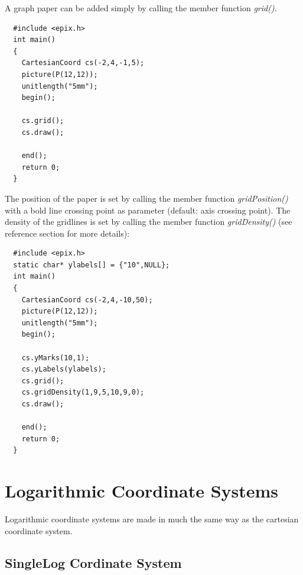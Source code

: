 \documentclass[12pt,a4paper]{article}
\begin{document}
  A graph paper can be added simply by calling the member function
  \textit{grid()}.

  \begin{minipage}{7.5cm}
    \begin{lstlisting}
  #include <epix.h>
  int main()
  {
    CartesianCoord cs(-2,4,-1,5);
    picture(P(12,12));
    unitlength("5mm");
    begin();

    cs.grid();
    cs.draw();

    end();
    return 0;
  }
    \end{lstlisting}
  \end{minipage}
  \begin{minipage}{5.5cm}
    
  \end{minipage}


  The position of the paper is set by calling the member function
  \textit{gridPosition()} with a bold line crossing point as parameter (default:
  axis crossing point). The density of the gridlines is set by calling the
  member function \textit{gridDensity()} (see reference section for more details):

  \begin{minipage}{7.5cm}
    \begin{lstlisting}
  #include <epix.h>
  static char* ylabels[] = {"10",NULL};
  int main()
  {
    CartesianCoord cs(-2,4,-10,50);
    picture(P(12,12));
    unitlength("5mm");
    begin();

    cs.yMarks(10,1);
    cs.yLabels(ylabels);
    cs.grid();
    cs.gridDensity(1,9,5,10,9,0);
    cs.draw();

    end();           
    return 0;
  }
    \end{lstlisting}
  \end{minipage}
  \begin{minipage}{5.5cm}
    \vspace{1.0cm}
    
  \end{minipage}


  \newpage
  \section{Logarithmic Coordinate Systems}

  Logarithmic coordinate systems are made in much the same way as the cartesian
  coordinate system.

  \subsection{SingleLog Cordinate System}
\end{document}
